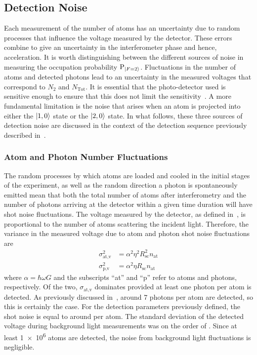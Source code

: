 \subsection{Detection Noise}\label{subsec:detection_noise}

Each measurement of the number of atoms has an uncertainty due to
random processes that influence the voltage measured by the detector. These errors
combine to give an uncertainty in the interferometer phase and
hence, acceleration. It is worth distinguishing between the different
sources of noise in measuring the occupation probability
$\text{P}_{\ket{F=2}}$. Fluctuations in the number of atoms and detected
photons lead to an uncertainty in the measured voltages that
correspond to $N_2$ and $N_\text{Tot}$. It is essential that the
photo-detector used is sensitive enough to ensure that this does not
limit the sensitivity~\cite{Rocco2014}. A more fundamental limitation
is the noise that arises when an atom is projected into either the
$\ket{1,0}$ state or the $\ket{2,0}$ state. In what follows, these
three sources of detection noise are discussed in the context of the
detection sequence previously described
in~. 
\subsubsection{Atom and Photon Number Fluctuations}
The random processes by which atoms are loaded and cooled in the
initial stages of the experiment, as well as the random direction a
photon is spontaneously emitted mean that both the total number of
atoms after interferometry and the number of photons arriving at the
detector within a given time duration will have shot noise
fluctuations. The voltage measured by the detector, as defined
in~, is proportional to the number of atoms
scattering the incident light. Therefore, the variance in the measured
voltage due to atom and photon shot noise fluctuations are 
\begin{align}
  \sigma_\text{at,v}^2 &= \alpha^2 \eta^2 R_\text{sc}^2 n_\text{at}\\
  \sigma_\text{p,v}^2 &= \alpha^2 \eta R_\text{sc} n_\text{at} 
  \label{eq:atom_photon_noise}
\end{align}
where $\alpha = \hbar \omega G$ and the subscripts ``at'' and ``p'' refer to atoms and photons,
respectively. Of the two, \(\sigma_\text{at,v}\) dominates provided at least one photon
per atom is detected. As previously discussed
in~, around 7 photons per atom
are detected, so this is certainly the case. For the detection parameters previously defined, the shot noise is equal to around  per atom. 
The standard deviation of the detected voltage during background light
measurements was on the order of . Since at
least \num{1e6} atoms are detected, the noise from background light
fluctuations is negligible.  

